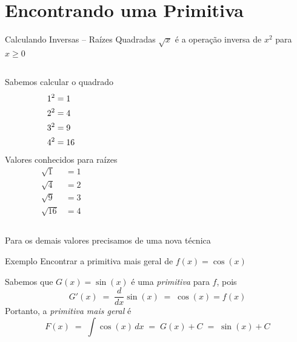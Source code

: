 \section{Encontrando uma Primitiva}

\begin{frame}{Calculando Inversas -- Raízes Quadradas}
\(\sqrt{x}\) é a operação inversa de \(x^2\) para \(x\geq0\)

\pause
\vspace{\baselineskip}
\begin{columns}
  Sabemos calcular o quadrado
  \begin{align*}
    \vphantom{\sqrt{9}} 1^2 & = 1 \\
    \vphantom{\sqrt{9}} 2^2 & = 4 \\
    \vphantom{\sqrt{9}} 3^2 & = 9 \\
    \vphantom{\sqrt{9}} 4^2 & = 16
  \end{align*}
  \pause
  Valores conhecidos para raízes
  \begin{align*}
    \sqrt{1}  & = 1 \\
    \sqrt{4}  & = 2 \\
    \sqrt{9}  & = 3 \\
    \sqrt{16} & = 4
  \end{align*}
\end{columns}

\pause
\vspace{\baselineskip}
Para os demais valores precisamos de uma nova técnica
\end{frame}

\begin{frame}{Exemplo}
  Encontrar a primitiva mais geral de \(f(x)= \cos(x)\)

  \pause
  Sabemos que
  \(
    G(x) = \sin(x)
  \)
  é uma \emph{primitiva} para $f$, pois
  \[
    G'(x)
    \;=\; \frac{d}{dx}\sin(x)
    \;=\; \cos(x) = f(x)
  \]
  \pause
  Portanto, a \emph{primitiva mais geral} é
  \[
    F(x)
    \;=\; \int \cos(x)\,dx
    \;=\; G(x) + C
    \;=\; \sin(x) + C
  \]
\end{frame}

